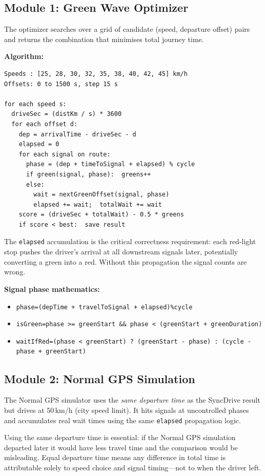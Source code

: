 \documentclass[12pt,a4paper]{report}
\begin{document}
\subsection{Module 1: Green Wave Optimizer}

The optimizer searches over a grid of candidate (speed, departure offset)
pairs and returns the combination that minimises total journey time.

\textbf{Algorithm:}
\begin{lstlisting}
Speeds : [25, 28, 30, 32, 35, 38, 40, 42, 45] km/h
Offsets: 0 to 1500 s, step 15 s

for each speed s:
  driveSec = (distKm / s) * 3600
  for each offset d:
    dep = arrivalTime - driveSec - d
    elapsed = 0
    for each signal on route:
      phase = (dep + timeToSignal + elapsed) % cycle
      if green(signal, phase):  greens++
      else:
        wait = nextGreenOffset(signal, phase)
        elapsed += wait;  totalWait += wait
    score = (driveSec + totalWait) - 0.5 * greens
    if score < best:  save result
\end{lstlisting}

The \texttt{elapsed} accumulation is the critical correctness requirement:
each red-light stop pushes the driver's arrival at all downstream signals
later, potentially converting a green into a red. Without this propagation
the signal counts are wrong.

\textbf{Signal phase mathematics:}
\begin{itemize}
  \item \texttt{phase\;=\;(depTime + travelToSignal + elapsed)\;\%\;cycle}
  \item \texttt{isGreen\;=\;phase >= greenStart \&\& phase < (greenStart + greenDuration)}
  \item \texttt{waitIfRed\;=\;(phase < greenStart) ? (greenStart - phase) : (cycle - phase + greenStart)}
\end{itemize}

\subsection{Module 2: Normal GPS Simulation}

The Normal GPS simulator uses the \textit{same departure time} as the
SyncDrive result but drives at 50\,km/h (city speed limit). It hits signals
at uncontrolled phases and accumulates real wait times using the same
\texttt{elapsed} propagation logic.

Using the same departure time is essential: if the Normal GPS simulation
departed later it would have less travel time and the comparison would be
misleading. Equal departure time means any difference in total time is
attributable solely to speed choice and signal timing---not to when the
driver left.
\end{document}
